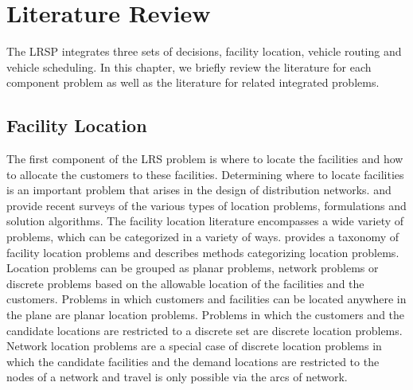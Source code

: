 

\section{Literature Review}
\label{literature}

The LRSP integrates three sets of decisions, facility location, 
vehicle routing and vehicle scheduling. In this chapter, we briefly 
review the literature for each component problem as well as the 
literature for related integrated problems. 

\subsection{Facility Location}

The first component of the LRS problem is where to locate the facilities 
and how to allocate the customers to these facilities. Determining where 
to locate facilities is an important problem that arises in the design of 
distribution networks. \citet{ReVelle} and \citet{Klose} provide recent 
surveys of the various types of location problems, formulations and solution 
algorithms. The facility location literature encompasses a wide variety of 
problems, which can be categorized in a variety of ways. \citet{Daskin} 
provides a taxonomy of facility location problems and describes methods 
categorizing location problems. Location problems can be grouped as planar 
problems, network problems or discrete problems based on the allowable 
location of the facilities and the customers. Problems in which customers 
and facilities can be located anywhere in the plane are planar location 
problems. Problems in which the customers and the candidate locations are 
restricted to a discrete set  are discrete location problems. Network 
location problems are a special case of discrete location problems in which 
the candidate facilities and the demand locations are restricted to the nodes 
of a network and travel is only possible via the arcs of network.

